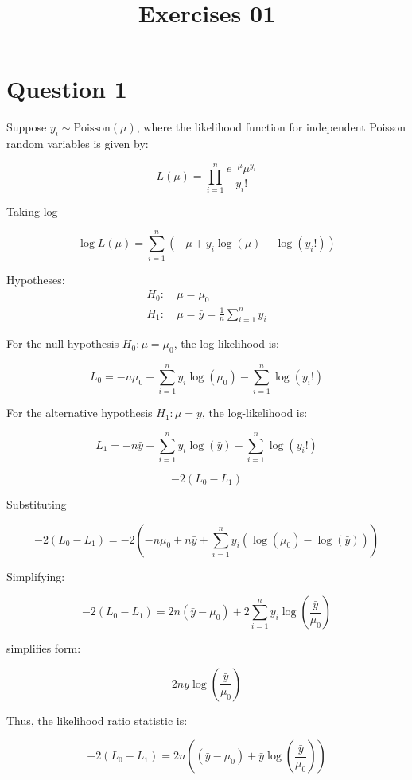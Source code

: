 \documentclass{article}
\title{Exercises 01}
\author{}
\date{}
\begin{document}
\maketitle

\section*{Question 1}



Suppose $y_i \sim \text{Poisson}(\mu)$, where the likelihood function for independent Poisson random variables is given by:

\[
L(\mu) = \prod_{i=1}^{n} \frac{e^{-\mu} \mu^{y_i}}{y_i!}
\]

Taking  log

\[
\log L(\mu) = \sum_{i=1}^{n} \left( -\mu + y_i \log(\mu) - \log(y_i!) \right)
\]

Hypotheses:
\begin{align*}
H_0: & \ \mu = \mu_0 \\
H_1: & \ \mu = \bar{y} = \frac{1}{n} \sum_{i=1}^{n} y_i
\end{align*}

For the null hypothesis $H_0: \mu = \mu_0$, the log-likelihood is:

\[
L_0 = -n\mu_0 + \sum_{i=1}^{n} y_i \log(\mu_0) - \sum_{i=1}^{n} \log(y_i!)
\]

For the alternative hypothesis $H_1: \mu = \bar{y}$, the log-likelihood is:

\[
L_1 = -n\bar{y} + \sum_{i=1}^{n} y_i \log(\bar{y}) - \sum_{i=1}^{n} \log(y_i!)
\]


\[
-2(L_0 - L_1)
\]

Substituting

\[
-2(L_0 - L_1) = -2 \left( -n\mu_0 + n\bar{y} + \sum_{i=1}^{n} y_i (\log(\mu_0) - \log(\bar{y})) \right)
\]

Simplifying:

\[
-2(L_0 - L_1) = 2n \left( \bar{y} - \mu_0 \right) + 2 \sum_{i=1}^{n} y_i \log \left( \frac{\bar{y}}{\mu_0} \right)
\]

simplifies form:

\[
2n \bar{y} \log \left( \frac{\bar{y}}{\mu_0} \right)
\]

Thus, the likelihood ratio statistic is:

\[
-2(L_0 - L_1) = 2n \left( (\bar{y} - \mu_0) + \bar{y} \log \left( \frac{\bar{y}}{\mu_0} \right) \right)
\]
\end{document}
